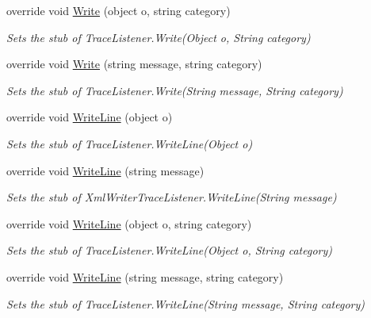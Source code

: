 \begin{DoxyCompactItemize}
override void \hyperlink{class_system_1_1_diagnostics_1_1_fakes_1_1_stub_xml_writer_trace_listener_a7fe873342899a25014090bbc53e651b2}{Write} (object o, string category)
\begin{DoxyCompactList}\small\item\em Sets the stub of Trace\-Listener.\-Write(\-Object o, String category)\end{DoxyCompactList}\item 
override void \hyperlink{class_system_1_1_diagnostics_1_1_fakes_1_1_stub_xml_writer_trace_listener_a1e28368e28ea31d7f7d73b31509d6092}{Write} (string message, string category)
\begin{DoxyCompactList}\small\item\em Sets the stub of Trace\-Listener.\-Write(\-String message, String category)\end{DoxyCompactList}\item 
override void \hyperlink{class_system_1_1_diagnostics_1_1_fakes_1_1_stub_xml_writer_trace_listener_ac06707ad8248fd6c00d445d91d4d2838}{Write\-Line} (object o)
\begin{DoxyCompactList}\small\item\em Sets the stub of Trace\-Listener.\-Write\-Line(\-Object o)\end{DoxyCompactList}\item 
override void \hyperlink{class_system_1_1_diagnostics_1_1_fakes_1_1_stub_xml_writer_trace_listener_a5927ef3742073299326c3799381bbbd0}{Write\-Line} (string message)
\begin{DoxyCompactList}\small\item\em Sets the stub of Xml\-Writer\-Trace\-Listener.\-Write\-Line(\-String message)\end{DoxyCompactList}\item 
override void \hyperlink{class_system_1_1_diagnostics_1_1_fakes_1_1_stub_xml_writer_trace_listener_a432b67f83c34e33e8495f66bbaf65c51}{Write\-Line} (object o, string category)
\begin{DoxyCompactList}\small\item\em Sets the stub of Trace\-Listener.\-Write\-Line(\-Object o, String category)\end{DoxyCompactList}\item 
override void \hyperlink{class_system_1_1_diagnostics_1_1_fakes_1_1_stub_xml_writer_trace_listener_a5b7e7f23b1ca762740887474ed18cd96}{Write\-Line} (string message, string category)
\begin{DoxyCompactList}\small\item\em Sets the stub of Trace\-Listener.\-Write\-Line(\-String message, String category)\end{DoxyCompactList}\end{DoxyCompactItemize}

